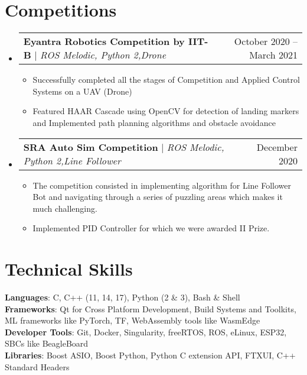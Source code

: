 \documentclass[letterpaper,11pt]{article}
\makeatletter
\newcommand{\resumeItem}[1]{
  \item\small{
    {#1 \vspace{-2pt}}
  }
}
\newcommand{\resumeProjectHeading}[2]{
    \item
    \begin{tabular*}{0.97\textwidth}{l@{\extracolsep{\fill}}r}
      \small#1 & #2 \\
    \end{tabular*}\vspace{-7pt}
}
\newcommand{\resumeSubHeadingListStart}{\begin{itemize}[leftmargin=0.15in, label={}]}
\newcommand{\resumeSubHeadingListEnd}{\end{itemize}}
\newcommand{\resumeItemListStart}{\begin{itemize}}
\newcommand{\resumeItemListEnd}{\end{itemize}\vspace{-5pt}}
\makeatother
\begin{document}
\section{Competitions}
    \resumeSubHeadingListStart
        \resumeProjectHeading
            {\textbf{Eyantra Robotics Competition by IIT-B} $|$ \emph{ROS Melodic, Python 2,Drone}}{October 2020 -- March 2021}
            \resumeItemListStart
                \resumeItem{Successfully completed all the stages of Competition and Applied Control Systems on a UAV (Drone)}
                \resumeItem{Featured HAAR Cascade using OpenCV for detection of landing markers and Implemented path planning algorithms and obstacle avoidance}
            \resumeItemListEnd
        \resumeProjectHeading
            {\textbf{SRA Auto Sim Competition} $|$ \emph{ROS Melodic, Python 2,Line Follower}}{December 2020}
            \resumeItemListStart
                \resumeItem{The competition consisted in implementing algorithm for Line Follower Bot and navigating through a series of puzzling areas which makes it much challenging.}
                \resumeItem{Implemented PID Controller for which we were awarded II Prize.}
            \resumeItemListEnd
    \resumeSubHeadingListEnd

\section{Technical Skills}
 \begin{itemize}[leftmargin=0.15in, label={}]
    \small{\item{
     \textbf{Languages}{: C, C++ (11, 14, 17), Python (2 \& 3), Bash \& Shell} \\
     \textbf{Frameworks}{: Qt for Cross Platform Development, Build Systems and Toolkits, ML frameworks like PyTorch, TF, WebAssembly tools like WasmEdge} \\
     \textbf{Developer Tools}{: Git, Docker, Singularity, freeRTOS, ROS, eLinux, ESP32, SBCs like BeagleBoard} \\
     \textbf{Libraries}{: Boost ASIO, Boost Python, Python C extension API, FTXUI,  C++ Standard Headers}
    }}
 \end{itemize}
    
\end{document}
